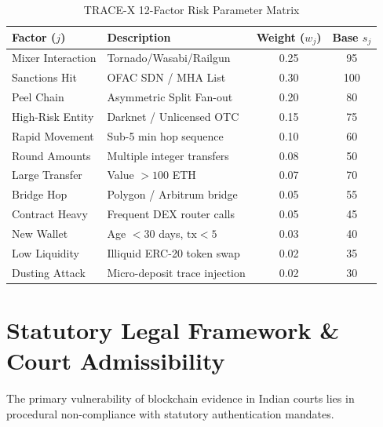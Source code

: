 \documentclass[10pt,twocolumn,a4paper]{article}
\begin{document}
\begin{table}[h]
\centering
\small
\caption{TRACE-X 12-Factor Risk Parameter Matrix}
\label{tab:risk_factors}
\begin{tabularx}{\columnwidth}{lXcc}
\toprule
\textbf{Factor ($j$)} & \textbf{Description} & \textbf{Weight ($w_j$)} & \textbf{Base $s_j$} \\
\midrule
Mixer Interaction & Tornado/Wasabi/Railgun & 0.25 & 95 \\
Sanctions Hit & OFAC SDN / MHA List & 0.30 & 100 \\
Peel Chain & Asymmetric Split Fan-out & 0.20 & 80 \\
High-Risk Entity & Darknet / Unlicensed OTC & 0.15 & 75 \\
Rapid Movement & Sub-5 min hop sequence & 0.10 & 60 \\
Round Amounts & Multiple integer transfers & 0.08 & 50 \\
Large Transfer & Value $> 100$ ETH & 0.07 & 70 \\
Bridge Hop & Polygon / Arbitrum bridge & 0.05 & 55 \\
Contract Heavy & Frequent DEX router calls & 0.05 & 45 \\
New Wallet & Age $< 30$ days, $\text{tx} < 5$ & 0.03 & 40 \\
Low Liquidity & Illiquid ERC-20 token swap & 0.02 & 35 \\
Dusting Attack & Micro-deposit trace injection & 0.02 & 30 \\
\bottomrule
\end{tabularx}
\end{table}

\section{Statutory Legal Framework \& Court Admissibility}
The primary vulnerability of blockchain evidence in Indian courts lies in procedural non-compliance with statutory authentication mandates.
\end{document}
